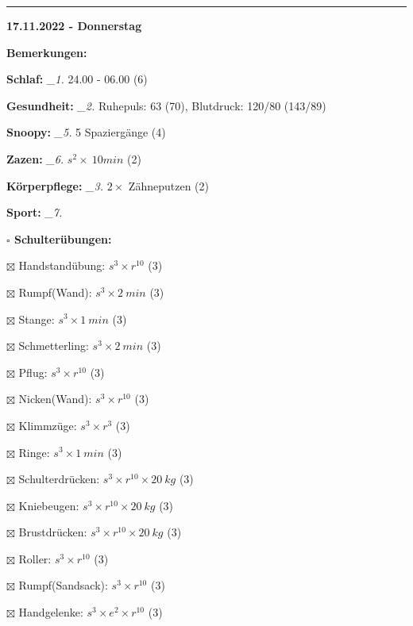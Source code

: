 \documentclass[10pt,a4paper]{article}
\newcommand\prop[1] {{\color {alizarin} {\bf #1}}}             %
\newcommand\rele[1] {{\color {english} \bf {#1}}}              %
\newcommand\mand[1] {{\color {burntorange} {\bf #1}}}          %
\newcommand\ddivide {\vskip -9pt \hrule \vskip 6pt}
\newcommand\topspace{\vskip -15pt \hskip 20pt}
\newcommand\n[1] { {\sl #1.} \hskip 5pt }
\begin{document}
\ddivide
{\rele {17.11.2022 - Donnerstag}}

\begin{mdframed}[style=daystyle]
  \begin{labeling}{{\mand {Bemerkungen:}}}
    \setlength\itemsep{-3pt}
  \item[{\mand {Schlaf:}}]        \n{\_1} 24.00 - 06.00 (6)
  \item[{\mand {Gesundheit:}}]    \n{\_2} Ruhepuls: 63 (70), Blutdruck: 120/80 (143/89)
  \item[{\mand {Snoopy:}}]        \n{\_5} 5 Spaziergänge (4)
  \item[{\mand {Zazen:}}]         \n{\_6} $s^2 \times\ 10 min$ (2)
  \item[{\mand {Körperpflege:}}]  \n{\_3} $2 \times$ Zähneputzen (2)
  \item[{\mand {Sport:}}]         \n{\_7}
    \topspace
    \begin{minipage}{0.75\textwidth}  
      \begin{labeling}{\prop {$\square$ {Schulterübungen:}}} 
        \setlength\itemsep{-3pt}
      \item[$\boxtimes$ Handstandübung:]  $s^3 \times r^{10}$ (3)
      \item[$\boxtimes$ Rumpf(Wand):]     $s^3 \times 2\ min$ (3)
      \item[$\boxtimes$ Stange:]          $s^3 \times 1\ min$ (3)
      \item[$\boxtimes$ Schmetterling:]   $s^3 \times 2\ min$ (3)
      \item[$\boxtimes$ Pflug:]           $s^3 \times r^{10}$ (3)
      \item[$\boxtimes$ Nicken(Wand):]    $s^3 \times r^{10}$ (3)
      \item[$\boxtimes$ Klimmzüge:]       $s^3 \times r^3$ (3)
      \item[$\boxtimes$ Ringe:]           $s^3 \times 1\ min$ (3)
      \item[$\boxtimes$ Schulterdrücken:] $s^3 \times r^{10} \times 20\ kg$ (3)
      \item[$\boxtimes$ Kniebeugen:]      $s^3 \times r^{10} \times 20\ kg$ (3)
      \item[$\boxtimes$ Brustdrücken:]    $s^3 \times r^{10} \times 20\ kg$ (3)
      \item[$\boxtimes$ Roller:]          $s^3 \times r^{10}$ (3)
      \item[$\boxtimes$ Rumpf(Sandsack):] $s^3 \times r^{10}$ (3)
      \item[$\boxtimes$ Handgelenke:]     $s^3 \times e^2 \times r^{10}$ (3)

\end{labeling}
\end{minipage}
\end{labeling}
\end{mdframed}
\end{document}
